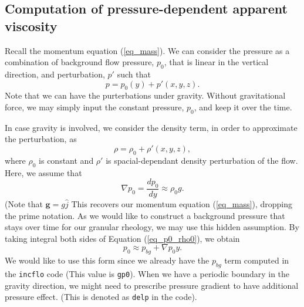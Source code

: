 \subsection{Computation of pressure-dependent apparent viscosity}

Recall the momentum equation (\ref{eq_mass}). We can consider the pressure as a combination of background flow pressure, $p_0$, that is linear in the vertical direction, and perturbation, $p'$ such that
\[
p = p_0(y) + p'(x,y,z).\]
Note that we can have the purterbations under gravity. Without gravitational force, we may simply input the constant pressure, $p_0$, and keep it over the time.
\par
In case gravity is involved, we consider the density term, in order to approximate the perturbation, as 
\[
\rho  = \rho_0  + \rho'(x,y,z), 
\]
where $\rho_0$ is constant and $\rho'$ is spacial-dependant density perturbation of the flow. 
Here, we assume that 
\begin{equation}
    \nabla p_0  = \frac{d p_0}{d y} \approx \rho_0  g.  
\label{eq_p0_rho0}
\end{equation}
(Note that ${\bm g} = g \hat{j}$
This recovers our momentum equation (\ref{eq_mass}), dropping the prime notation. As we would like to construct a background pressure that stays over time for our granular rheology, we may use this hidden assumption.
By taking integral both sides of Equation (\ref{eq_p0_rho0}), we obtain
\begin{equation}
    p_0 \approx p_{bg} + \nabla p_0 y.
\end{equation}
We would like to use this form since we already have the $p_{bg}$ term computed in the \verb+incflo+ code (This value is \verb+gp0+).
When we have a periodic boundary in the gravity direction, we might need to prescribe pressure gradient to have additional pressure effect.
(This is denoted as \verb+delp+ in the code). 
